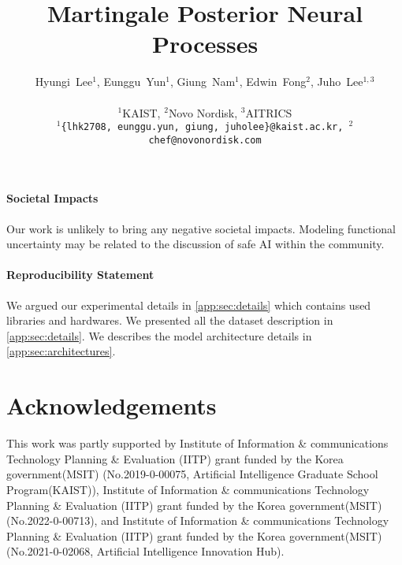\documentclass{article} %
\title{Martingale Posterior Neural Processes}
\author{Hyungi~Lee$^{1}$, Eunggu~Yun$^{1}$, Giung~Nam$^{1}$, Edwin~Fong$^{2}$, Juho~Lee$^{1,3}$ \\ 
\vspace{-0.1in}
\\
$^1$KAIST, $^2$Novo Nordisk, $^3$AITRICS \\
\footnotesize
\texttt{$^1$\{lhk2708,\,eunggu.yun,\,giung,\,juholee\}@kaist.ac.kr, $^2$chef@novonordisk.com}
}
\begin{document}
\maketitle

\begin{abstract}

\end{abstract}








\clearpage
\newpage
\paragraph{Societal Impacts}
Our work is unlikely to bring any negative societal impacts. Modeling functional uncertainty may be related to the discussion of safe AI within the community.

\paragraph{Reproducibility Statement}
We argued our experimental details in \cref{app:sec:details} which contains used libraries and hardwares.
We presented all the dataset description in \cref{app:sec:details}.
We describes the model architecture details in \cref{app:sec:architectures}.

\section*{Acknowledgements}
This work was partly supported by Institute of Information \& communications Technology Planning \& Evaluation (IITP) grant funded by the Korea government(MSIT) 
(No.2019-0-00075, Artificial Intelligence Graduate School Program(KAIST)), Institute of Information \& communications Technology Planning \& Evaluation (IITP) grant funded by the Korea government(MSIT) (No.2022-0-00713), and Institute of Information \& communications Technology Planning \& Evaluation (IITP) grant funded by the Korea government(MSIT) (No.2021-0-02068, Artificial Intelligence Innovation Hub).


\clearpage
\newpage
\appendix






\end{document}
